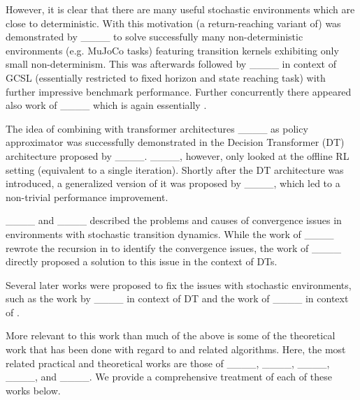 However, it is clear that there are many useful stochastic
environments which are close to deterministic.
With this motivation (a return-reaching variant of) \eUDRL{} was
demonstrated by ____ to solve successfully many non-deterministic environments (e.g. MuJoCo tasks) featuring transition kernels exhibiting only small non-determinism.
This was afterwards followed by ____
in context of GCSL (essentially \eUDRL{} restricted to fixed horizon and state reaching task) with further impressive benchmark performance.
Further concurrently there appeared also work of ____
which is again essentially \eUDRL{}.

The idea of combining \eUDRL{} with transformer architectures ____ as policy approximator was successfully demonstrated in the Decision Transformer (DT) architecture proposed by ____.
____, however, only looked at the offline RL setting (equivalent to a single \eUDRL{} iteration).
Shortly after the DT architecture was introduced, a generalized version of it was proposed by ____, which led to a non-trivial performance improvement.

____ and ____
described the problems and causes of \eUDRL{} convergence issues 
in environments with stochastic transition dynamics.
While the work of ____ rewrote the recursion in \eUDRL{} to identify the convergence issues,
the work of ____ directly proposed a solution to this issue in the context of DTs.

Several later works were proposed to fix the issues with \eUDRL{} stochastic environments, such as the work by ____ in context of DT and 
the work of ____ in context of \eUDRL{}.

More relevant to this work than much of the above is some of the theoretical work that has been done with regard to \eUDRL{} and related algorithms.
Here, the most related practical and theoretical works are those of
____,
____,
____,
____, and
____.
We provide a comprehensive treatment of each of these works below.

